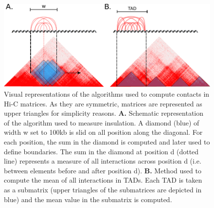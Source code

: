 \documentclass[11pt,a4paper]{report}
\begin{document}
\begin{figure}[ht]
	\includegraphics[width=1\textwidth]{Figures/4_interactions.pdf}
	\caption{Visual representations of the algorithms used to compute contacts in Hi-C matrices. As they are symmetric, matrices are represented as upper triangles for simplicity reasons. \textbf{A.} Schematic representation of the algorithm used to measure insulation. A diamond (blue) of width w set to 100kb is slid on all position along the diagonal. For each position, the sum in the diamond is computed and later used to define boundaries. The sum in the diamond at position d (dotted line) represents a measure of all interactions across position d (i.e. between elements before and after position d). \textbf{B.} Method used to compute the mean of all interactions in TADs. Each TAD is taken as a submatrix (upper triangles of the submatrices are depicted in blue) and the mean value in the submatrix is computed. }
	\label{interact_hic}
\end{figure}
\end{document}

